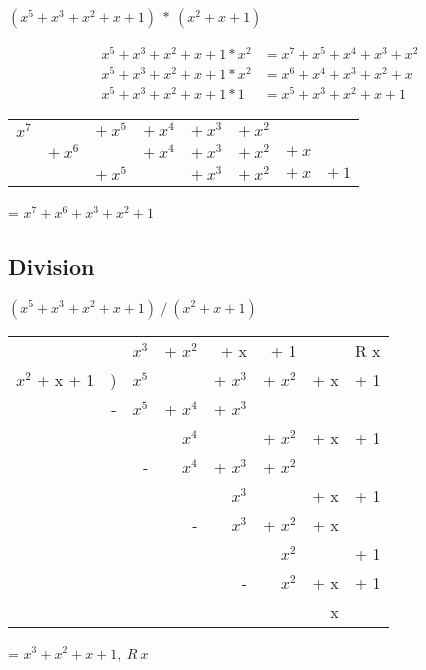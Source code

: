 \documentclass[letterpaper]{article}
\begin{document}
\((x^5 + x^3 + x^2 + x + 1)\ *\ (x^2 + x + 1)\)

\begin{equation*}
  \begin{split}
    x^5 + x^3 + x^2 + x + 1 * x^2 &= x^7 + x^5 + x^4 + x^3 + x^2 \\
    x^5 + x^3 + x^2 + x + 1 * x^2 &= x^6 + x^4 + x^3 + x^2 + x \\
    x^5 + x^3 + x^2 + x + 1 * 1 &= x^5 + x^3 + x^2 + x + 1
  \end{split}
\end{equation*}

\begin{tabular}{ c c c c c c c c }
\(x^7\) &   & \(+\ x^5\) & \(+\ x^4\) & \(+\ x^3\) &\(+\ x^2\)&   &   \\
  & \(+\ x^6\) &   & \(+\ x^4\) & \(+\ x^3\) & \(+\ x^2\) &\(+\ x\) &   \\
  &   & \(+\ x^5\) &   & \(+\ x^3\) & \(+\ x^2\) & \(+\ x\) & \(+\ 1\) \\
\end{tabular}

= \(x^7 + x^6 + x^3 + x^2 + 1\)

\subsection{Division}

\((x^5 + x^3 + x^2 + x + 1)\ /\ (x^2 + x + 1)\)

\bigskip

\begin{tabular}{rrrrrrrr}
                &   & \(x^3\) & + \(x^2\) & + x       & + 1       &     & R x \\ \hhline{~-------}
\(x^2\) + x + 1 & ) & \(x^5\) &           & + \(x^3\) & + \(x^2\) & + x & + 1 \\
                & - & \(x^5\) & + \(x^4\) & + \(x^3\) &           &     &     \\ \hhline{~~------}
                &   &         &   \(x^4\) &           & + \(x^2\) & + x & + 1 \\
                &   &      -  &   \(x^4\) & + \(x^3\) & + \(x^2\) &     &     \\ \hhline{~~~-----}
                &   &         &           & \(x^3\)   &           & + x & + 1 \\
                &   &         &         - & \(x^3\)   & + \(x^2\) & + x &     \\ \hhline{~~~~----}
                &   &         &           &           & \(x^2\)   &     & + 1 \\
                &   &         &           & -         & \(x^2\)   & + x & + 1 \\ \hhline{~~~~~---}
                &   &         &           &           &      & x   &    
\end{tabular}

= \(x^3 + x^2 + x + 1,\ R\ x\)
\end{document}
